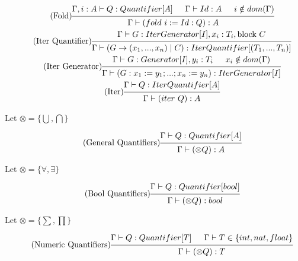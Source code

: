 \documentclass{article}
\begin{document}
\begin{gather}
\\
\tag{Fold}
\begin{prooftree}
\hypo{\Gamma, i: A \vdash Q: Quantifier[A]}
\hypo{\Gamma \vdash Id: A}
\hypo{i \notin dom(\Gamma)}
\infer3{\Gamma \vdash (fold\ i := Id : Q): A}
\end{prooftree}
\\
\tag{Iter Quantifier}
\begin{prooftree}
\hypo{\Gamma \vdash G: IterGenerator[I], x_i:T_i, \text{block }C}
\infer1{\Gamma \vdash (G \rightarrow (x_1, ..., x_n) \mid C): IterQuantifier[(T_1, ..., T_n)]}
\end{prooftree}
\\
\tag{Iter Generator}
\begin{prooftree}
\hypo{\Gamma \vdash G: Generator[I], y_i:T_i}
\hypo{x_i \notin dom(\Gamma)}
\infer2{\Gamma \vdash (G : x_1 := y_1; ... ; x_n := y_n): IterGenerator[I]}
\end{prooftree}
\\
\tag{Iter}
\begin{prooftree}
\hypo{\Gamma \vdash Q: IterQuantifier[A]}
\infer1{\Gamma \vdash (iter\ Q): A}
\end{prooftree}
\end{gather}

Let $\otimes = \{ \bigcup, \bigcap \}$

\begin{gather}
\tag{General Quantifiers}
\begin{prooftree}
\hypo{\Gamma \vdash Q: Quantifier[A]} %
\infer1{\Gamma \vdash (\otimes Q): A}
\end{prooftree}
\end{gather}

Let $\otimes = \{ \forall, \exists \}$

\begin{gather}
\tag{Bool Quantifiers}
\begin{prooftree}
\hypo{\Gamma \vdash Q: Quantifier[bool]}
\infer1{\Gamma \vdash (\otimes Q): bool}
\end{prooftree}
\end{gather}

Let $\otimes = \{ \sum, \prod \}$

\begin{gather}
\tag{Numeric Quantifiers}
\begin{prooftree}
\hypo{\Gamma \vdash Q: Quantifier[T]}
\hypo{\Gamma \vdash T \in \{int, nat, float\}}
\infer2{\Gamma \vdash (\otimes Q): T}
\end{prooftree}
\end{gather}
\end{document}

